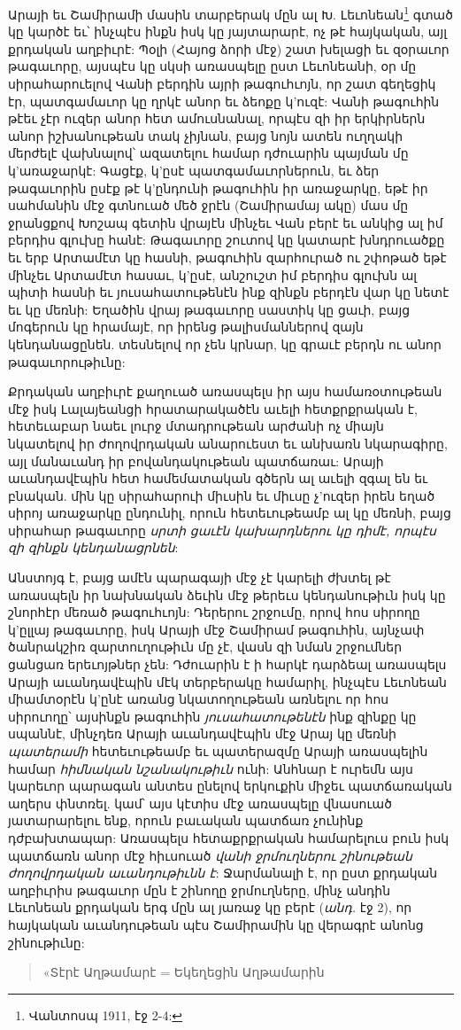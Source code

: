 \documentclass{article}
\begin{document}
{Արայի եւ Շամիրամի մասին տարբերակ մըն ալ Խ. Լեւոնեան\footnote{Վանտոսպ 1911, էջ 2-4:} գտած կը կարծէ եւ՝ ինչպէս ինքն իսկ կը յայտարարէ, ոչ թէ հայկական, այլ քրդական աղբիւրէ: Պօլի (Հայոց ձորի մէջ) շատ խելացի եւ զօրաւոր թագաւորը, այսպէս կը սկսի առասպելը ըստ Լեւոնեանի, օր մը սիրահարուելով Վանի բերդին այրի թագուհւոյն, որ շատ գեղեցիկ էր, պատգամաւոր կը ղրկէ անոր եւ ձեոքը կ'ուզէ: Վանի թագուհին թէեւ չէր ուզեր անոր հետ ամուսնանալ, որպէս զի իր երկիրներն անոր իշխանութեան տակ չիյնան, բայց նոյն ատեն ուղղակի մերժելէ վախնալով՝ ազատելու համար դժուարին պայման մը կ'առաջարկէ: Գացէք, կ'ըսէ պատգամաւորներուն, եւ ձեր թագաւորին ըսէք թէ կ'ընդունի թագուհին իր առաջարկը, եթէ իր սահմանին մէջ գտնուած մեծ ջրէն (Շամիրամայ ակը) մաս մը ջրանցքով Խոշապ գետին վրայէն մինչեւ Վան բերէ եւ անկից ալ իմ բերդիս գլուխը հանէ: Թագաւորը շուտով կը կատարէ խնդրուածքը եւ երբ Արտամէտ կը հասնի, թագուհին զարհուրած ու շփոթած եթէ մինչեւ Արտամէտ հասաւ, կ'ըսէ, անշուշտ իմ բերդիս գլուխն ալ պիտի հասնի եւ յուսահատութենէն ինք զինքն բերդէն վար կը նետէ եւ կը մեռնի: Եղածին վրայ թագաւորը սաստիկ կը ցաւի, բայց մոգերուն կը հրամայէ, որ իրենց թալիսմաններով զայն կենդանացընեն. տեսնելով որ չեն կրնար, կը գրաւէ բերդն ու անոր թագաւորութիւնը:

Քրդական աղբիւրէ քաղուած առասպելս իր այս համառօտութեան մէջ իսկ Լալայեանցի հրատարակածէն աւելի հետքրքրական է, հետեւաբար նաեւ լուրջ մտադրութեան արժանի ոչ միայն նկատելով իր ժողովրդական անարուեստ եւ անխառն նկարագիրը, այլ մանաւանդ իր բովանդակութեան պատճառաւ: Արայի աւանդավէպին հետ համեմատական գծերն ալ աւելի զգալ են եւ բնական. մին կը սիրահարուի միւսին եւ միւսը չ'ուզեր իրեն եղած սիրոյ առաջարկը ընդունիլ, որուն հետեւութեամբ ալ կը մեռնի, բայց սիրահար թագաւորը \emph{սրտի ցաւէն կախարդներու կը դիմէ, որպէս զի զինքն կենդանացրնեն}:

Անստոյգ է, բայց ամէն պարագայի մէջ չէ կարելի ժխտել թէ առասպելն իր նախնական ձեւին մէջ թերեւս կենդանութիւն իսկ կը շնորհէր մեռած թագուհւոյն: Դերերու շրջումը, որով հոս սիրողը կ'ըլլայ թագաւորը, իսկ Արայի մէջ Շամիրամ թագուհին, այնչափ ծանրակշիռ զարտուղութիւն մը չէ, վասն զի նման շրջումներ ցանցառ երեւոյթներ չեն: Դժուարին է ի հարկէ դարձեալ առասպելս Արայի աւանդավէպին մէկ տերբերակը համարիլ, ինչպէս Լեւոնեան միամտօրէն կ'ընէ առանց նկատողութեան առնելու որ հոս սիրուողը՝ այսինքն թագուհին \emph{յուսահատութենէն} ինք զինքը կը սպաննէ, մինչդեռ Արայի աւանդավէպին մէջ Արայ կը մեռնի \emph{պատերամի} հետեւութեամբ եւ պատերազմը Արայի առասպելին համար \emph{հիմնական նշանակութիւն} ունի: Անհնար է ուրեմն այս կարեւոր պարագան անտես ընելով երկուքին միջեւ պատճառական աղերս փնտռել. կամ՝ այս կէտիս մէջ առասպելը վնասուած յատարարելու ենք, որուն բաւական պատճառ չունինք դժբախտապար:
\clearpage
Առասպելս հետաքրքրական համարելուս բուն իսկ պատճառն անոր մէջ հիւսուած \emph{վանի ջրմուղներու շինութեան ժողովրդական աւանդութիւնն է}: Ջարմանալի է, որ ըստ քրդական աղբիւրիս թագաւոր մըն է շինողը ջրմուղները, մինչ անդին Լեւոնեան քրդական երգ մըն ալ յառաջ կը բերէ (\emph{անդ.} էջ 2), որ հայկական աւանդութեան պէս Շամիրամին կը վերագրէ անոնց շինութիւնը:
\begin{quotation}
\arm
\scriptsize
«Տէրէ Աղթամարէ = Եկեղեցին Աղթամարին


\end{quotation}}
\end{document}
